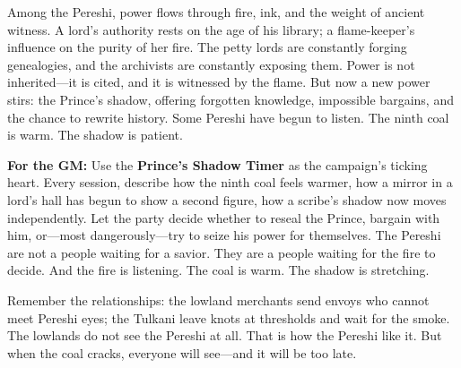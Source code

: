 \begin{tcolorbox}[colback=black!3,colframe=black!40!white,title={Patronage \& Power},breakable]
Among the Pereshi, power flows through fire, ink, and the weight of ancient witness. A lord's authority rests on the age of his library; a flame-keeper's influence on the purity of her fire. The petty lords are constantly forging genealogies, and the archivists are constantly exposing them. Power is not inherited---it is cited, and it is witnessed by the flame. But now a new power stirs: the Prince's shadow, offering forgotten knowledge, impossible bargains, and the chance to rewrite history. Some Pereshi have begun to listen. The ninth coal is warm. The shadow is patient.

\textbf{For the GM:} Use the \textbf{Prince's Shadow Timer } as the campaign's ticking heart. Every session, describe how the ninth coal feels warmer, how a mirror in a lord's hall has begun to show a second figure, how a scribe's shadow now moves independently. Let the party decide whether to reseal the Prince, bargain with him, or---most dangerously---try to seize his power for themselves. The Pereshi are not a people waiting for a savior. They are a people waiting for the fire to decide. And the fire is listening. The coal is warm. The shadow is stretching.

Remember the relationships: the lowland merchants send envoys who cannot meet Pereshi eyes; the Tulkani leave knots at thresholds and wait for the smoke. The lowlands do not see the Pereshi at all. That is how the Pereshi like it. But when the coal cracks, everyone will see---and it will be too late.
\end{tcolorbox}

